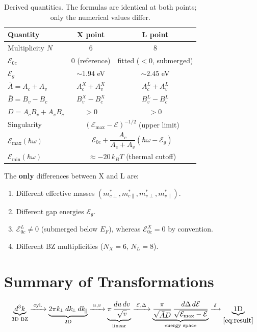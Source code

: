 \documentclass[11pt, a4paper]{article}
\newcommand{\E}{\mathcal{E}}
\newcommand{\Eoc}{\E_{0c}}
\newcommand{\Eg}{\E_g}
\newcommand{\Emax}{\E_{\max}}
\newcommand{\Emin}{\E_{\min}}
\newcommand{\Abar}{\bar{A}}
\newcommand{\Bbar}{\bar{B}}
\newcommand{\kperp}{k_{\!\perp}}
\newcommand{\kpar}{k_{\!\parallel}}
\newcommand{\hw}{\hbar\omega}
\begin{document}
\begin{table}[ht]
    \centering
    \caption{Derived quantities. The formulas are identical at both points; only the numerical values differ.}\label{tab:derived}
    \smallskip
    \renewcommand{\arraystretch}{1.3}
    \small
    \begin{tabular}{@{}lcc@{}}
        \toprule
        Quantity & \textbf{X point} & \textbf{L point} \\
        \midrule
        Multiplicity $N$ & 6 & 8 \\[2pt]
        $\Eoc$ & 0 (reference) & fitted ($< 0$, submerged) \\[2pt]
        $\Eg$ & ${\sim}1.94$ eV & ${\sim}2.45$ eV \\[2pt]
        $\Abar = A_c + A_v$ & $A_c^X + A_v^X$ & $A_c^L + A_v^L$ \\[2pt]
        $\Bbar = B_v - B_c$ & $B_v^X - B_c^X$ & $B_v^L - B_c^L$ \\[2pt]
        $D = A_cB_v + A_vB_c$ & $> 0$ & $> 0$ \\[2pt]
        Singularity & \multicolumn{2}{c}{$(\Emax - \E)^{-1/2}$ (upper limit)} \\[2pt]
        $\Emax(\hw)$ & \multicolumn{2}{c}{$\Eoc + \dfrac{A_c}{A_c + A_v}(\hw - \Eg)$} \\[8pt]
        $\Emin(\hw)$ & \multicolumn{2}{c}{$\approx -20\,k_BT$ (thermal cutoff)} \\[4pt]
        \bottomrule
    \end{tabular}
\end{table}

The \textbf{only} differences between X and L are:
\begin{enumerate}
    \item Different effective masses $(m^*_{c\perp}, m^*_{c\parallel}, m^*_{v\perp}, m^*_{v\parallel})$.
    \item Different gap energies $\Eg$.
    \item $\Eoc^L \neq 0$ (submerged below $E_F$), whereas $\Eoc^X = 0$ by convention.
    \item Different BZ multiplicities ($N_X = 6$, $N_L = 8$).
\end{enumerate}

\section*{Summary of Transformations}

\begin{equation*}
    \underbrace{d^3k}_{\text{3D BZ}}
    \xrightarrow{\;\text{cyl.}\;}
    \underbrace{2\pi\kperp\,d\kperp\,d\kpar}_{\text{2D}}
    \xrightarrow{\;u,v\;}
    \underbrace{\pi\,\frac{du\,dv}{\sqrt{v}}}_{\text{linear}}
    \xrightarrow{\;\E,\Delta\;}
    \underbrace{\frac{\pi}{\sqrt{\Abar D}}\,
    \frac{d\Delta\,d\E}{\sqrt{\Emax-\E}}}_{\text{energy space}}
    \xrightarrow{\;\delta\;}
    \underbrace{\text{1D}}_{\eqref{eq:result}}
\end{equation*}
\end{document}
